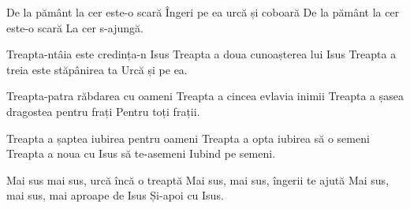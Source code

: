 
\beginchorus
De la pământ la cer este-o scară
Îngeri pe ea urcă și coboară
De la pământ la cer este-o scară
La cer s-ajungă.
\endchorus

\beginverse
Treapta-ntâia este credința-n Isus
Treapta a doua cunoașterea lui Isus
Treapta a treia este stăpânirea ta
Urcă și pe ea.
\endverse

\beginverse
Treapta-patra răbdarea cu oameni
Treapta a cincea evlavia inimii
Treapta a șasea dragostea pentru frați
Pentru toți frații.
\endverse

\beginverse
Treapta a șaptea iubirea pentru oameni
Treapta a opta iubirea să o semeni
Treapta a noua cu Isus să te-asemeni
Iubind pe semeni.
\endverse

\beginverse*
Mai sus mai sus, urcă încă o treaptă
Mai sus, mai sus, îngerii te ajută
Mai sus, mai sus, mai aproape de Isus
Și-apoi cu Isus.
\endverse

\endsong
